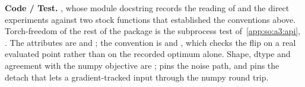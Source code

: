 \begin{sloppypar}
\textbf{Code / Test.} , whose module
docstring records the reading of  and
the direct experiments against two stock functions that established the
conventions above. Torch-freedom of the rest of the package is the subprocess
test of~\ref{app:so:a3:api},
. The attributes are
 and
; the
convention is
and , which checks the
flip on a real evaluated point rather than on the recorded optimum alone. Shape,
dtype and agreement with the numpy objective are
;
 pins the
noise path, and
 pins the
detach that lets a gradient-tracked input through the numpy round trip.
\end{sloppypar}
